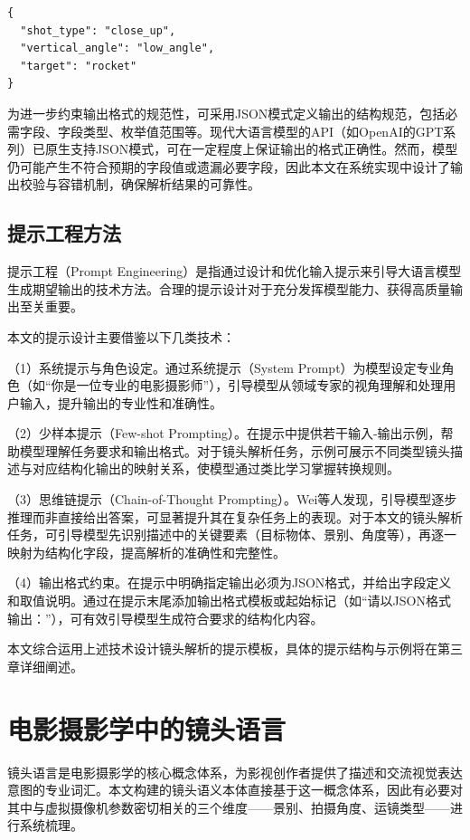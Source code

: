 \begin{verbatim}
{
  "shot_type": "close_up",
  "vertical_angle": "low_angle",
  "target": "rocket"
}
\end{verbatim}

为进一步约束输出格式的规范性，可采用JSON模式定义输出的结构规范，包括必需字段、字段类型、枚举值范围等。现代大语言模型的API（如OpenAI的GPT系列）已原生支持JSON模式，可在一定程度上保证输出的格式正确性。然而，模型仍可能产生不符合预期的字段值或遗漏必要字段，因此本文在系统实现中设计了输出校验与容错机制，确保解析结果的可靠性。

\subsection{提示工程方法}

提示工程（Prompt Engineering）是指通过设计和优化输入提示来引导大语言模型生成期望输出的技术方法\cite{sahoo2024systematic}。合理的提示设计对于充分发挥模型能力、获得高质量输出至关重要。

本文的提示设计主要借鉴以下几类技术：

（1）系统提示与角色设定。通过系统提示（System Prompt）为模型设定专业角色（如“你是一位专业的电影摄影师”），引导模型从领域专家的视角理解和处理用户输入，提升输出的专业性和准确性。

（2）少样本提示（Few-shot Prompting）。在提示中提供若干输入-输出示例，帮助模型理解任务要求和输出格式。对于镜头解析任务，示例可展示不同类型镜头描述与对应结构化输出的映射关系，使模型通过类比学习掌握转换规则。

（3）思维链提示（Chain-of-Thought Prompting）。Wei等人\cite{wei2022chain}发现，引导模型逐步推理而非直接给出答案，可显著提升其在复杂任务上的表现。对于本文的镜头解析任务，可引导模型先识别描述中的关键要素（目标物体、景别、角度等），再逐一映射为结构化字段，提高解析的准确性和完整性。

（4）输出格式约束。在提示中明确指定输出必须为JSON格式，并给出字段定义和取值说明。通过在提示末尾添加输出格式模板或起始标记（如“请以JSON格式输出：”），可有效引导模型生成符合要求的结构化内容。

本文综合运用上述技术设计镜头解析的提示模板，具体的提示结构与示例将在第三章详细阐述。

\section{电影摄影学中的镜头语言}

镜头语言是电影摄影学的核心概念体系，为影视创作者提供了描述和交流视觉表达意图的专业词汇\cite{arijon1976grammar,mascelli1965five}。本文构建的镜头语义本体直接基于这一概念体系，因此有必要对其中与虚拟摄像机参数密切相关的三个维度——景别、拍摄角度、运镜类型——进行系统梳理。


